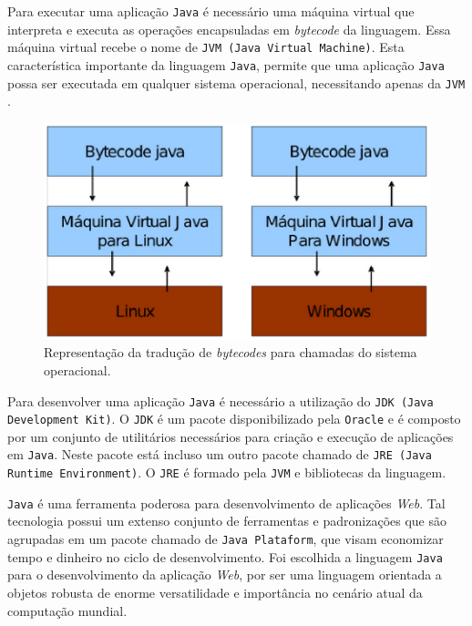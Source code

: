 Para executar uma aplicação \texttt{Java} é necessário uma máquina virtual que interpreta e executa as operações
encapsuladas em \textit{bytecode} da linguagem. Essa máquina virtual recebe o nome de \texttt{JVM (Java Virtual Machine)}. 
Esta característica importante da linguagem \texttt{Java}, permite que uma aplicação \texttt{Java} possa ser executada em qualquer
sistema operacional, necessitando apenas da \texttt{JVM} \cite{caelumjava}.

\begin{figure}[h]
	\centering
	\caption{\label{virtual}Representação da tradução de \textit{bytecodes} para chamadas do sistema operacional.}
		\includegraphics[keepaspectratio=true,scale=1]{figuras/virtual.eps}
\end{figure}

Para desenvolver uma aplicação \texttt{Java} é necessário a utilização do \texttt{JDK (Java Development Kit)}. 
O \texttt{JDK} é um pacote disponibilizado pela \texttt{Oracle} e é composto por um conjunto de utilitários necessários
para criação e execução de aplicações em \texttt{Java}. Neste pacote está incluso um outro pacote chamado de 
\texttt{JRE (Java Runtime Environment)}. O \texttt{JRE} é formado pela \texttt{JVM} e bibliotecas da linguagem.

\texttt{Java} é uma ferramenta poderosa para desenvolvimento de aplicações \textit{Web}. Tal tecnologia  possui 
um extenso conjunto de ferramentas e padronizações que são agrupadas em um pacote chamado de \texttt{Java Plataform}, 
que visam economizar tempo e dinheiro no ciclo de desenvolvimento. Foi escolhida 
a linguagem \texttt{Java} para o desenvolvimento da aplicação \textit{Web}, por ser uma linguagem orientada a objetos robusta de enorme 
versatilidade e importância no cenário atual da computação mundial.

